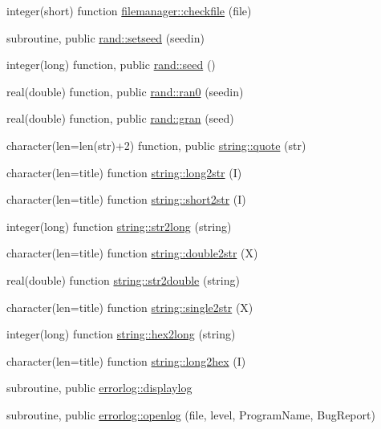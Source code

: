 \begin{DoxyCompactItemize}
\item 
integer(short) function \hyperlink{namespacefilemanager_a0c7a869ddf6cd3ea9fad5b6de4069cf3}{filemanager\+::checkfile} (file)
\item 
subroutine, public \hyperlink{namespacerand_a632224183164f720bd47baa916a5ab8b}{rand\+::setseed} (seedin)
\item 
integer(long) function, public \hyperlink{namespacerand_a0bf2019d6e29304bea88b6dfc7277e96}{rand\+::seed} ()
\item 
real(double) function, public \hyperlink{namespacerand_a750567ffa303a800f86ffc3bd5705137}{rand\+::ran0} (seedin)
\item 
real(double) function, public \hyperlink{namespacerand_a7bf88c16a64dbc594c0b21871f34e15c}{rand\+::gran} (seed)
\item 
character(len=len(str)+2) function, public \hyperlink{namespacestring_a43ac41bc9fa839e5e40ec725c029b5a4}{string\+::quote} (str)
\item 
character(len=title) function \hyperlink{namespacestring_a734300e2e50f76efa2730b5f1cc7cc21}{string\+::long2str} (I)
\item 
character(len=title) function \hyperlink{namespacestring_ac3e429fd86c78765b2408096ae132f8a}{string\+::short2str} (I)
\item 
integer(long) function \hyperlink{namespacestring_aefd9037a03dddf650cb9d0a18ed7de95}{string\+::str2long} (string)
\item 
character(len=title) function \hyperlink{namespacestring_a229fed3adef608ec305da7cbc54b24a8}{string\+::double2str} (X)
\item 
real(double) function \hyperlink{namespacestring_a73d6072e501eb7ed3d5aa9e4a5a47f6d}{string\+::str2double} (string)
\item 
character(len=title) function \hyperlink{namespacestring_a78ede8e0d165537ea978aeeb8227bc3f}{string\+::single2str} (X)
\item 
integer(long) function \hyperlink{namespacestring_a133490e9f060a404b52108895b255435}{string\+::hex2long} (string)
\item 
character(len=title) function \hyperlink{namespacestring_a58fb75f0ded0856267e7770d4b13b2f6}{string\+::long2hex} (I)
\item 
subroutine, public \hyperlink{namespaceerrorlog_a05d233f410ba88bf3e2929528b1bb91e}{errorlog\+::displaylog}
\item 
subroutine, public \hyperlink{namespaceerrorlog_a32bbf87dd265de25bd10ea31d95b751d}{errorlog\+::openlog} (file, level, Program\+Name, Bug\+Report)

\end{DoxyCompactItemize}
